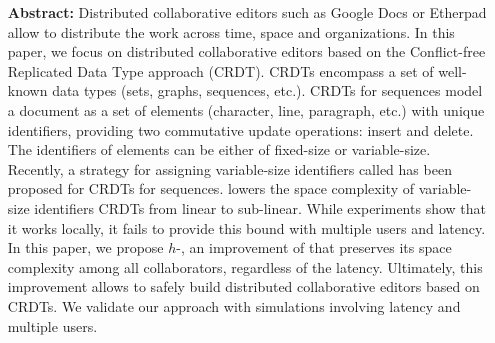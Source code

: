\begin{itemize}
\item [\textbf{Abstract:}] {\small Distributed collaborative editors such as
    Google Docs or Etherpad allow to distribute the work across time, space and
    organizations. In this paper, we focus on distributed collaborative editors
    based on the Conflict-free Replicated Data Type approach (CRDT). CRDTs
    encompass a set of well-known data types (sets, graphs, sequences,
    etc.). CRDTs for sequences model a document as a set of elements (character,
    line, paragraph, etc.) with unique identifiers, providing two commutative
    update operations: insert and delete. The identifiers of elements can be
    either of fixed-size or variable-size. Recently, a strategy for assigning
    variable-size identifiers called \LSEQ has been proposed for CRDTs for
    sequences. \LSEQ lowers the space complexity of variable-size identifiers
    CRDTs from linear to sub-linear. While experiments show that it works
    locally, it fails to provide this bound with multiple users and latency. In
    this paper, we propose $h$-\LSEQ, an improvement of \LSEQ that preserves its
    space complexity among all collaborators, regardless of the
    latency. Ultimately, this improvement allows to safely build distributed
    collaborative editors based on CRDTs. We validate our approach with
    simulations involving latency and multiple users.}
\end{itemize}